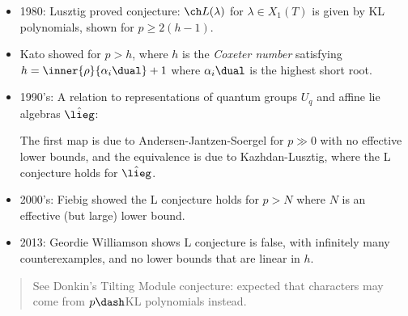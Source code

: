 \begin{itemize}
\item
  1980: Lusztig proved conjecture: \(\ch L(\lambda)\) for
  \(\lambda \in X_1(T)\) is given by KL polynomials, shown for
  \(p \geq 2(h-1)\).
\item
  Kato showed for \(p> h\), where \(h\) is the \emph{Coxeter number}
  satisfying \(h = \inner{\rho}{\alpha_i \dual} + 1\) where
  \(\alpha_i\dual\) is the highest short root.
\item
  1990's: A relation to representations of quantum groups \(U_q\) and
  affine lie algebras \(\hat \lieg\):

  \begin{center}
  \end{center}

  The first map is due to Andersen-Jantzen-Soergel for \(p\gg 0\) with
  no effective lower bounds, and the equivalence is due to
  Kazhdan-Lusztig, where the L conjecture holds for \(\hat \lieg\).
\item
  2000's: Fiebig showed the L conjecture holds for \(p>N\) where \(N\)
  is an effective (but large) lower bound.
\item
  2013: Geordie Williamson shows L conjecture is false, with infinitely
  many counterexamples, and no lower bounds that are linear in \(h\).
\end{itemize}

\begin{quote}
See Donkin's Tilting Module conjecture: expected that characters may
come from \(p\dash\)KL polynomials instead.
\end{quote}

